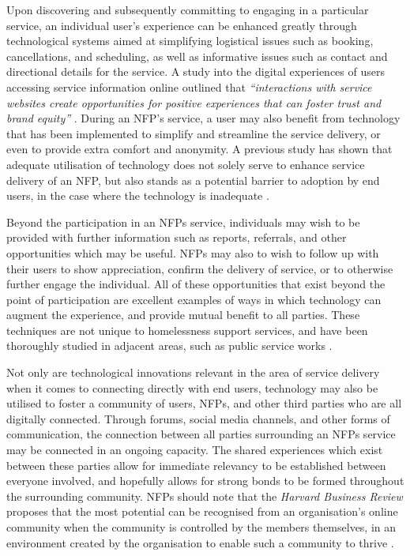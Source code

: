 Upon discovering and subsequently committing to engaging in a particular service, an individual user's experience can be enhanced greatly through technological systems aimed at simplifying logistical issues such as booking, cancellations, and scheduling, as well as informative issues such as contact and directional details for the service. A study into the digital experiences of users accessing service information online outlined that \emph{“interactions with service websites create opportunities for positive experiences that can foster trust and brand equity”} \cite[p.~7]{bilgihan2015applying}. During an NFP's service, a user may also benefit from technology that has been implemented to simplify and streamline the service delivery, or even to provide extra comfort and anonymity. A previous study has shown that adequate utilisation of technology does not solely serve to enhance service delivery of an NFP, but also stands as a potential barrier to adoption by end users, in the case where the technology is inadequate \cite{walker2002technology}.

Beyond the participation in an NFPs service, individuals may wish to be provided with further information such as reports, referrals, and other opportunities which may be useful. NFPs may also to wish to follow up with their users to show appreciation, confirm the delivery of service, or to otherwise further engage the individual. All of these opportunities that exist beyond the point of participation are excellent examples of ways in which technology can augment the experience, and provide mutual benefit to all parties. These techniques are not unique to homelessness support services, and have been thoroughly studied in adjacent areas, such as public service works \cite{bovaird2007beyond}.

Not only are technological innovations relevant in the area of service delivery when it comes to connecting directly with end users, technology may also be utilised to foster a community of users, NFPs, and other third parties who are all digitally connected. Through forums, social media channels, and other forms of communication, the connection between all parties surrounding an NFPs service may be connected in an ongoing capacity. The shared experiences which exist between these parties allow for immediate relevancy to be established between everyone involved, and hopefully allows for strong bonds to be formed throughout the surrounding community. NFPs should note that the \emph{Harvard Business Review} proposes that the most potential can be recognised from an organisation's online community when the community is controlled by the members themselves, in an environment created by the organisation to enable such a community to thrive \cite{fournier2009getting}.


